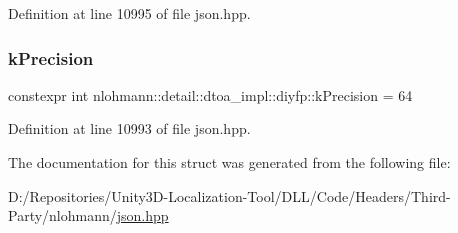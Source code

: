 Definition at line 10995 of file json.\+hpp.

\mbox{\label{structnlohmann_1_1detail_1_1dtoa__impl_1_1diyfp_a03682754b06ed4f30b263119eecc2d52}} 
\subsubsection{\texorpdfstring{kPrecision}{kPrecision}}
{\footnotesize\ttfamily constexpr int nlohmann\+::detail\+::dtoa\+\_\+impl\+::diyfp\+::k\+Precision = 64\hspace{0.3cm}{\ttfamily [static]}}



Definition at line 10993 of file json.\+hpp.



The documentation for this struct was generated from the following file\+:\begin{DoxyCompactItemize}
\item 
D\+:/\+Repositories/\+Unity3\+D-\/\+Localization-\/\+Tool/\+D\+L\+L/\+Code/\+Headers/\+Third-\/\+Party/nlohmann/\mbox{\hyperlink{json_8hpp}{json.\+hpp}}\end{DoxyCompactItemize}
